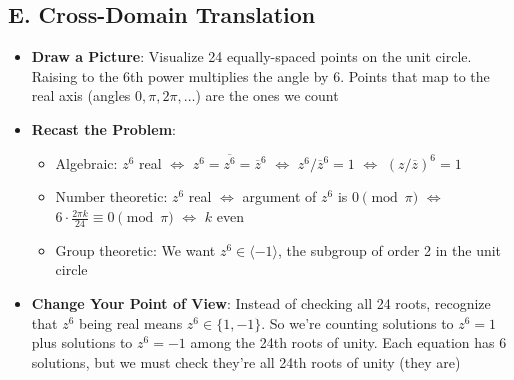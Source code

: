 \documentclass[]{article}
\begin{document}
\begin{strategicbox}
\subsection*{E. Cross-Domain Translation}
\begin{itemize}[leftmargin=*]
    \item \textbf{Draw a Picture}: Visualize 24 equally-spaced points on the unit circle. Raising to the 6th power multiplies the angle by 6. Points that map to the real axis (angles $0, \pi, 2\pi, \ldots$) are the ones we count
    \item \textbf{Recast the Problem}: 
    \begin{itemize}
        \item Algebraic: $z^6$ real $\Leftrightarrow$ $z^6 = \overline{z^6} = \overline{z}^6$ $\Leftrightarrow$ $z^6/\overline{z}^6 = 1$ $\Leftrightarrow$ $(z/\overline{z})^6 = 1$
        \item Number theoretic: $z^6$ real $\Leftrightarrow$ argument of $z^6$ is $0 \pmod{\pi}$ $\Leftrightarrow$ $6 \cdot \frac{2\pi k}{24} \equiv 0 \pmod{\pi}$ $\Leftrightarrow$ $k$ even
        \item Group theoretic: We want $z^6 \in \langle -1 \rangle$, the subgroup of order 2 in the unit circle
    \end{itemize}
    \item \textbf{Change Your Point of View}: Instead of checking all 24 roots, recognize that $z^6$ being real means $z^6 \in \{1, -1\}$. So we're counting solutions to $z^6 = 1$ plus solutions to $z^6 = -1$ among the 24th roots of unity. Each equation has 6 solutions, but we must check they're all 24th roots of unity (they are)
\end{itemize}
\end{strategicbox}
\end{document}
